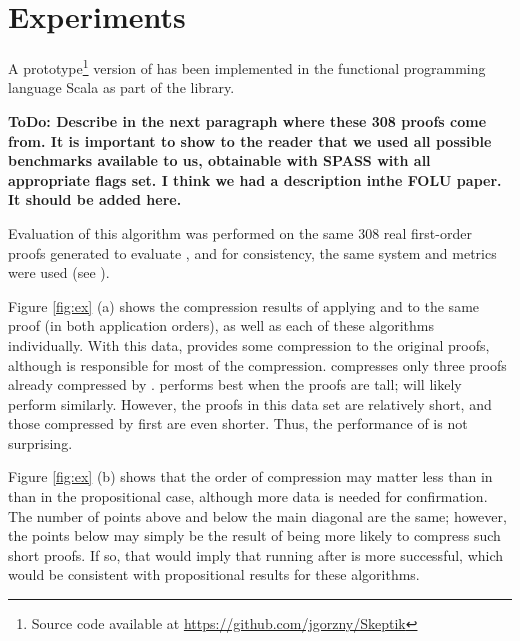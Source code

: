 \section{Experiments} \label{sec:exp}
A prototype\footnote{Source code available at \url{https://github.com/jgorzny/Skeptik}} version of {\FORPI} has been implemented in the functional programming language Scala as part of the \skeptik
 library. %

\textbf{ToDo: Describe in the next paragraph where these 308 proofs come from. It is important to show to the reader that we used all possible benchmarks available to us, obtainable with SPASS with all appropriate flags set. I think we had a description inthe FOLU paper. It should be added here.}

Evaluation of this algorithm was performed on the same 308 real first-order proofs generated to evaluate {\GFOLU}, and for consistency, the same system and metrics were used (see \cite{GFOLU}).

Figure \ref{fig:ex} (a) shows the compression results of applying {\FORPI} and {\GFOLU} to the same proof (in both application orders), as well as each of these algorithms individually. 
With this data, {\FORPI} provides some compression to the original proofs, although {\GFOLU} is responsible for most of the compression. {\FORPI} compresses only three proofs already compressed by {\GFOLU}.
{\RPI} performs best when the proofs are tall; {\FORPI} will likely perform similarly. However, the proofs in this data set are relatively short, and those compressed by {\GFOLU} first are even shorter. Thus, the performance of {\FORPI} is not surprising.

Figure \ref{fig:ex} (b) shows that the order of compression may matter less than in than in the propositional case, although more data is needed for confirmation. The number of points above and below the main diagonal are the same; however, the points below may simply be the result of {\GFOLU} being more likely to compress such short proofs. If so, that would imply that running {\FORPI} after {\GFOLU} is more successful, which would be consistent with propositional results for these algorithms.


